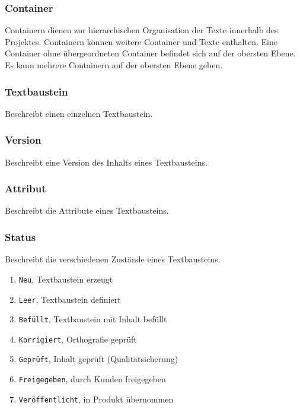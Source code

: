 \subsubsection{Container}\label{model:container}

Containern dienen zur hierarchischen Organisation der Texte innerhalb des Projektes. Containern können weitere Container und Texte enthalten. Eine Container ohne übergeordneten Container befindet sich auf der obersten Ebene. Es kann mehrere Containern auf der obersten Ebene geben.

\subsubsection{Textbaustein}\label{model:textbaustein}

Beschreibt einen einzelnen Textbaustein.

\subsubsection{Version}\label{model:version}

Beschreibt eine Version des Inhalts eines Textbausteins.

\subsubsection{Attribut}\label{model:attribut}

Beschreibt die Attribute eines Textbausteins.

\subsubsection{Status}\label{model:status}

Beschreibt die verschiedenen Zustände eines Textbausteins.

\begin{enumerate}\itemsep -5pt
\item \texttt{Neu}, Textbaustein erzeugt
\item \texttt{Leer}, Textbaustein definiert
\item \texttt{Befüllt}, Textbaustein mit Inhalt befüllt
\item \texttt{Korrigiert}, Orthografie geprüft
\item \texttt{Geprüft}, Inhalt geprüft (Qualitätsicherung)
\item \texttt{Freigegeben}, durch Kunden freigegeben
\item \texttt{Veröffentlicht}, in Produkt übernommen
\end{enumerate}

